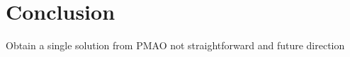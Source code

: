 

\section{Conclusion}

Obtain a single solution from PMAO not straightforward and future direction




%

